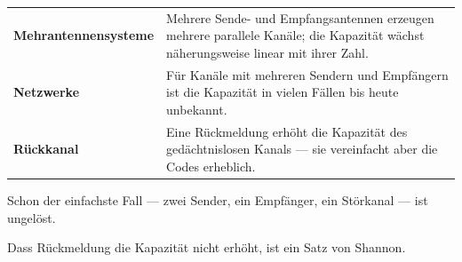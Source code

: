 \begin{forschung}
\begin{center}
{\small
\renewcommand{\arraystretch}{1.45}
\begin{tabular}{@{}P{2.8cm}P{5.4cm}@{}}
\toprule
\textbf{Mehrantennen\-systeme} & Mehrere Sende- und Empfangsantennen erzeugen mehrere parallele Kanäle; die Kapazität wächst näherungsweise linear mit ihrer Zahl.\\
\textbf{Netzwerke} & Für Kanäle mit mehreren Sendern und Empfängern ist die Kapazität in vielen Fällen bis heute unbekannt.\\
\textbf{Rückkanal} & Eine Rückmeldung erhöht die Kapazität des gedächtnislosen Kanals  --- sie vereinfacht aber die Codes erheblich.\\
\bottomrule
\end{tabular}}
\end{center}

Schon der einfachste Fall --- zwei Sender, ein Empfänger, ein Störkanal --- ist ungelöst.

\begin{center}
\begin{minipage}{0.88\textwidth}
\end{minipage}
\end{center}

Dass Rückmeldung die Kapazität nicht erhöht, ist ein Satz von Shannon.

\begin{center}
\begin{minipage}{0.88\textwidth}
\end{minipage}
\end{center}
\end{forschung}

